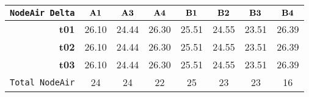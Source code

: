 \begin{tabular}{r|ccccccc}\cline{2-8}
\tt NodeAir Delta&$\bf A1$&$\bf A3$&$\bf A4$&$\bf B1$&$\bf B2$&$\bf B3$&$\bf B4$\\\hline
\bf t01& 26.10& 24.44& 26.30& 25.51& 24.55& 23.51& 26.39\\
\bf t02& 26.10& 24.44& 26.30& 25.51& 24.55& 23.51& 26.39\\
\bf t03& 26.10& 24.44& 26.30& 25.51& 24.55& 23.51& 26.39\\
\hline
\tt Total NodeAir& 24& 24& 22& 25& 23& 23& 16\\
\end{tabular}
